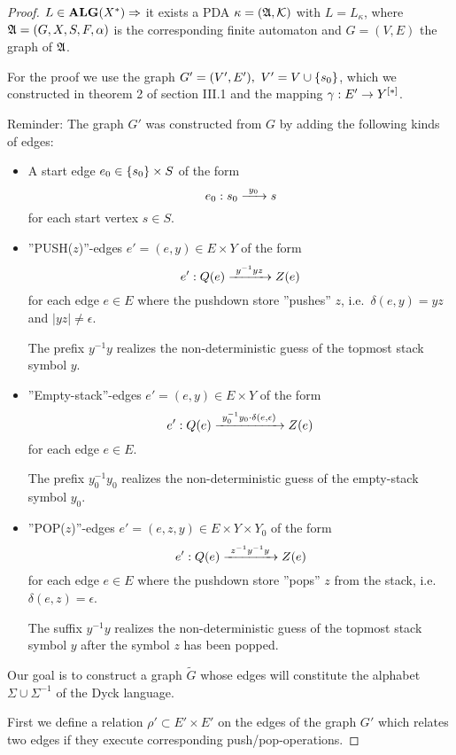 \begin{proof}
$L\in \mbox{{\bf ALG}}(X^*) \Rightarrow$ it exists a PDA $\kappa=(\mbox{$\mathfrak{A}$},\mbox{$\mathcal{K}$})$ with
$L = L_\kappa$, where $\mbox{$\mathfrak{A}$}=(G, X, S, F, \alpha)$ is the corresponding finite
automaton and $G=(V, E)$ the graph of $\mbox{$\mathfrak{A}$}$.

For the proof we use the graph $G'=(V',E'),\ V' = V \cup \mbox{$\{s_0\}$}$, which we
constructed in theorem 2 of section III.1 and the mapping $\gamma: E' \to 
\mbox{${Y}^{[*]}$}$.

Reminder: The graph $G'$ was constructed from $G$ by adding the following kinds
of edges:
\begin{itemize}
  \item A start edge $e_0 \in \mbox{$\{s_0\}$} \times S$ of the form 
  \[ e_0: s_0 \xrightarrow{\ {y_0}\ } s \] 
  for each start vertex $s \in S$.
  
  \item ''PUSH($z$)''-edges $e'=(e, y) \in E \times Y$ of the form
  \[ e': Q(e) \xrightarrow{\ {y^{-1} y z}\ } Z(e) \]
  for each edge $e \in E$ where the pushdown store ''pushes'' $z$,
  i.e.\ $\delta(e, y) = yz$ and $|yz| \neq \epsilon$. 
  
  The prefix $y^{-1} y$ realizes the non-deterministic guess of the topmost
  stack symbol $y$.
  
  \item ''Empty-stack''-edges $e'=(e, y) \in E \times Y$ of the form
  \[ e': Q(e) \xrightarrow{\ {y_0^{-1} y_0 \cdot \delta(e, \epsilon)}\ } Z(e) \]
  for each edge $e \in E$.
  
  The prefix $y_0^{-1} y_0$ realizes the non-deterministic guess of the
  empty-stack symbol $y_0$.
  
  \item ''POP($z$)''-edges $e'=(e, z, y) \in E \times Y \times Y_0$ of the form
  \[ e': Q(e) \xrightarrow{\ {z^{-1} y^{-1} y}\ } Z(e) \]
  for each edge $e \in E$ where the pushdown store ''pops'' $z$ from the stack,
  i.e.\ $\delta(e, z) = \epsilon$.
  
  The suffix $y^{-1} y$ realizes the non-deterministic guess of the topmost
  stack symbol $y$ after the symbol $z$ has been popped.
\end{itemize}

Our goal is to construct a graph $\tilde{G}$ whose edges will constitute the
alphabet $\Sigma \cup \Sigma^{-1}$ of the Dyck language.

First we define a relation $\rho' \subset E' \times E'$ on the edges of the
graph $G'$ which relates two edges if they execute corresponding 
push/pop-operations.


\end{proof}

